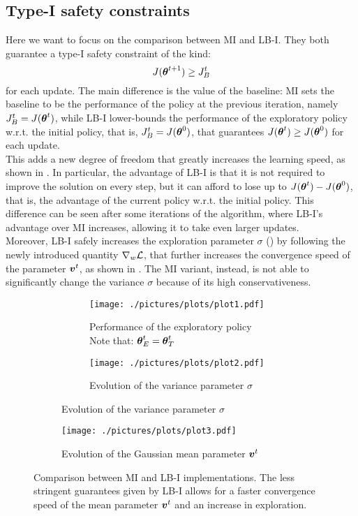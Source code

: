 \subsection{Type-I safety constraints}

Here we want to focus on the comparison between MI and LB-I. They both guarantee a type-I safety constraint of the kind:
\[
J(\vtheta^{t+1}) \geq \jbase
\]
for each update. The main difference is the value of the baseline: MI sets the baseline to be the performance of the policy at the previous iteration, namely $\jbase[t] = J(\vtheta^t)$, while LB-I lower-bounds the performance of the exploratory policy w.r.t. the initial policy, that is, $\jbase = J(\vtheta^0)$, that guarantees $J(\vtheta^t) \geq J(\vtheta^0)$ for each update.\\
This adds a new degree of freedom that greatly increases the learning speed, as shown in . In particular, the advantage of LB-I is that it is not required to improve the solution on every step, but it can afford to lose up to $J(\vtheta^t) - J(\vtheta^0)$, that is, the advantage of the current policy w.r.t. the initial policy. This difference can be seen after some iterations of the algorithm, where LB-I's advantage over MI increases, allowing it to take even larger updates.\\
Moreover, LB-I safely increases the exploration parameter $\sigma$ () by following the newly introduced quantity $\gradDelta$, that further increases the convergence speed of the parameter $\vv^t$, as shown in . The MI variant, instead, is not able to significantly change the variance $\sigma$ because of its high conservativeness. 

\begin{figure}[t]
\centering
\begin{subfigure}[t]{\textwidth}
\begin{subfigure}[t]{0.5\textwidth}
\texttt{[image: ./pictures/plots/plot1.pdf]}
\caption{Performance of the exploratory policy \\Note that: $\vtheta^t_E = \vtheta^t_T$} \label{fig:plot1-1}
\end{subfigure}
\hfill
\begin{subfigure}[t]{0.5\textwidth}
\texttt{[image: ./pictures/plots/plot2.pdf]}
\caption{Evolution of the variance parameter $\sigma$} \label{fig:plot1-2}
\end{subfigure}
\end{subfigure}
\begin{subfigure}[t]{0.5\textwidth}
\texttt{[image: ./pictures/plots/plot3.pdf]}
\caption{Evolution of the Gaussian mean parameter $\vv^t$} \label{fig:plot1-3}
\end{subfigure}
\caption[Comparison between MI and LB-I implementations.]{Comparison between MI and LB-I implementations. The less stringent guarantees given by LB-I allows for a faster convergence speed of the mean parameter $\vv^t$ and an increase in exploration. }
\label{fig:plot1}
\end{figure}

